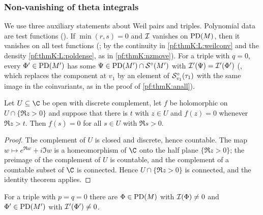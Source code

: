 \subsubsection{Non-vanishing of theta integrals}\label{sec:pf:thmK:nonzero}
We use three auxiliary statements about Weil pairs and triples. Polynomial data are test functions
(). If $\min(r,s)=0$ and $\mathcal{I}$ vanishes on $\operatorname{PD}(M)$, then it vanishes on all test
functions (; by the continuity in \ref{pf:thmK:L:weilconv} and the density
\ref{pf:thmK:L:poldense}, as in \cref{pf:thmK:nzmove}). For a triple with $q=0$, every $\Phi'\in\operatorname{PD}(M')$ has some
$\Psi\in\operatorname{PD}(M')\cap\mathcal{S}^{\circ}(M')$ with $\mathcal{I}'(\Psi)=\mathcal{I}'(\Phi')$ (, which replaces
the component at $v_1$ by an element of $\mathcal{S}^{\circ}_{v_1}(\tau_1)$ with the same image in the coinvariants, as in the proof of
\cref{pf:thmK:anall}).

\begin{lemma}\label{pf:thmK:identity}
Let $U\subseteq\C$ be open with discrete complement, let $f$ be holomorphic on $U\cap\{\Re z>0\}$ and suppose that there is
$t$ with $z\in U$ and $f(z)=0$ whenever $\Re z>t$. Then $f(s)=0$ for all $s\in U$ with $\Re s>0$.
\end{lemma}

\begin{proof}
The complement of $U$ is closed and discrete, hence countable. The map $w\mapsto e^{\Re w}+i\Im w$ is a homeomorphism of
$\C$ onto the half plane $\{\Re z>0\}$; the preimage of the complement of $U$ is countable, and the complement of a countable
subset of $\C$ is connected. Hence $U\cap\{\Re z>0\}$ is connected, and the identity theorem applies.
\end{proof}

\begin{proposition}\label{pf:thmK:nonzerobot}
For a triple with $p=q=0$ there are $\Phi\in\operatorname{PD}(M)$ with $\mathcal{I}(\Phi)\ne0$ and $\Phi'\in\operatorname{PD}(M')$ with
$\mathcal{I}'(\Phi')\ne0$.
\end{proposition}

